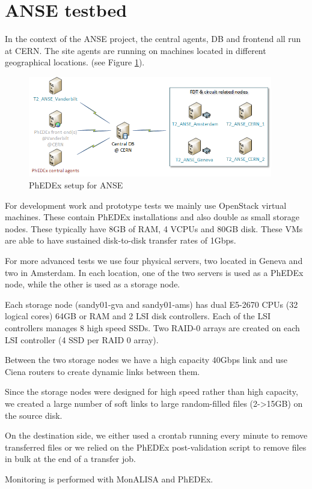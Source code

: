 \section{ANSE testbed}

In the context of the ANSE project, the central agents, DB and frontend all run
at CERN. The site agents are running on machines located in different geographical
locations. (see Figure \ref{fig:ANSE-setup}).

\begin{figure}[h]
  \centering
  \includegraphics[width=0.95\textwidth]{Figures/ANSE-setup.png}
  \caption{PhEDEx setup for ANSE}
  \label{fig:ANSE-setup}
\end{figure}

For development work and prototype tests we mainly use OpenStack virtual machines.
These contain PhEDEx installations and also double as small storage nodes. These
typically have 8GB of RAM, 4 VCPUs and 80GB disk. These VMs are able to have
sustained disk-to-disk transfer rates of 1Gbps.

For more advanced tests we use four physical servers, two located in Geneva and 
two in Amsterdam. In each location, one of the two servers is used as a PhEDEx node, 
while the other is used as a storage node.

Each storage node (sandy01-gva and sandy01-ams) has dual E5-2670 CPUs (32 logical cores)
64GB or RAM and 2 LSI disk controllers. Each of the LSI controllers manages
8 high speed SSDs. Two RAID-0 arrays are created on each LSI controller (4 SSD per
RAID 0 array).

Between the two storage nodes we have a high capacity 40Gbps link and use Ciena
routers to create dynamic links between them.

Since the storage nodes were designed for high speed rather than high capacity,
we created a large number of soft links to large random-filled files (2->15GB) 
on the source disk. 

On the destination side, we either used a crontab running every minute to remove
transferred files or we relied on the PhEDEx post-validation  script to remove 
files in bulk at the end of a transfer job.

Monitoring is performed with MonALISA\cite{MonALISA}\cite{MonALISA site} and PhEDEx.
